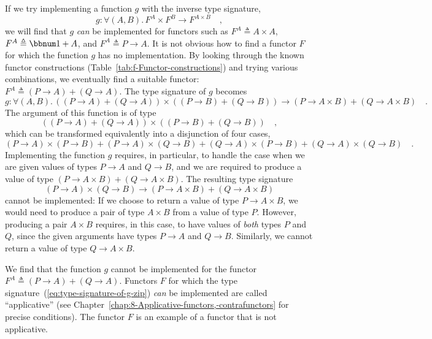 If we try implementing a function $g$ with the inverse type signature,
\begin{equation}
g:\forall(A,B).\,F^{A}\times F^{B}\rightarrow F^{A\times B}\quad,\label{eq:type-signature-of-g-zip}
\end{equation}
we will find that $g$ \emph{can} be implemented for functors such
as $F^{A}\triangleq A\times A$, $F^{A}\triangleq\bbnum 1+A$, and
$F^{A}\triangleq P\rightarrow A$. It is not obvious how to find a
functor $F$ for which the function $g$ has no implementation. By
looking through the known functor constructions (Table~\ref{tab:f-Functor-constructions})
and trying various combinations, we eventually find a suitable functor:
$F^{A}\triangleq(P\rightarrow A)+(Q\rightarrow A)$. The type signature
of $g$ becomes
\[
g:\forall(A,B).\,\left((P\rightarrow A)+(Q\rightarrow A)\right)\times\left((P\rightarrow B)+(Q\rightarrow B)\right)\rightarrow(P\rightarrow A\times B)+(Q\rightarrow A\times B)\quad.
\]
The argument of this function is of type
\[
\left((P\rightarrow A)+(Q\rightarrow A)\right)\times\left((P\rightarrow B)+(Q\rightarrow B)\right)\quad,
\]
which can be transformed equivalently into a disjunction of four cases,
\[
(P\rightarrow A)\times(P\rightarrow B)+(P\rightarrow A)\times(Q\rightarrow B)+(Q\rightarrow A)\times(P\rightarrow B)+(Q\rightarrow A)\times(Q\rightarrow B)\quad.
\]
Implementing the function $g$ requires, in particular, to handle
the case when we are given values of types $P\rightarrow A$ and $Q\rightarrow B$,
and we are required to produce a value of type $(P\rightarrow A\times B)+(Q\rightarrow A\times B)$.
The resulting type signature
\[
(P\rightarrow A)\times(Q\rightarrow B)\rightarrow(P\rightarrow A\times B)+(Q\rightarrow A\times B)
\]
cannot be implemented: If we choose to return a value of type $P\rightarrow A\times B$,
we would need to produce a pair of type $A\times B$ from a value
of type $P$. However, producing a pair $A\times B$ requires, in
this case, to have values of \emph{both} types $P$ and $Q$, since
the given arguments have types $P\rightarrow A$ and $Q\rightarrow B$.
Similarly, we cannot return a value of type $Q\rightarrow A\times B$.

We find that the function $g$ cannot be implemented for the functor
$F^{A}\triangleq(P\rightarrow A)+(Q\rightarrow A)$. Functors $F$
for which the type signature~(\ref{eq:type-signature-of-g-zip})
\emph{can} be implemented are called \textsf{``}applicative\textsf{''}
(see Chapter~\ref{chap:8-Applicative-functors,-contrafunctors} for
precise conditions). The functor $F$ is an example of a functor that
is not applicative.


